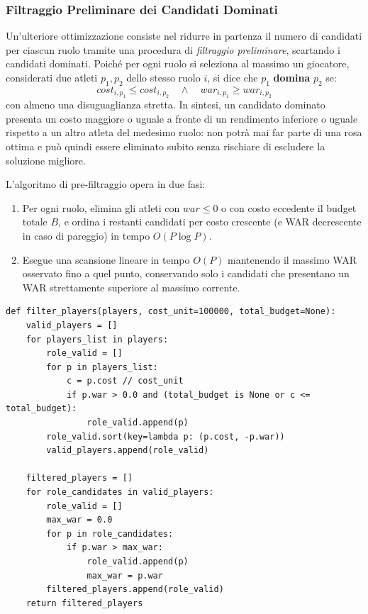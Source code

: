 \subsubsection{Filtraggio Preliminare dei Candidati Dominati}
Un'ulteriore ottimizzazione consiste nel ridurre in partenza il numero di candidati per ciascun ruolo tramite una procedura di \textit{filtraggio preliminare}, scartando i candidati dominati.
Poiché per ogni ruolo si seleziona al massimo un giocatore, considerati due atleti $p_1, p_2$ dello stesso ruolo $i$, si dice che $p_1$ \textbf{domina} $p_2$ se:
\begin{equation}
	\mathit{cost}_{i, p_1} \le \mathit{cost}_{i, p_2} \quad \wedge \quad \mathit{war}_{i, p_1} \ge \mathit{war}_{i, p_2}
\end{equation}
con almeno una disuguaglianza stretta. In sintesi, un candidato dominato presenta un costo maggiore o uguale a fronte di un rendimento inferiore o uguale rispetto a un altro atleta del medesimo ruolo: non potrà mai far parte di una rosa ottima e può quindi essere eliminato subito senza rischiare di escludere la soluzione migliore.

L'algoritmo di pre-filtraggio opera in due fasi:
\begin{enumerate}
	\item Per ogni ruolo, elimina gli atleti con $\mathit{war} \le 0$ o con costo eccedente il budget totale $B$, e ordina i restanti candidati per costo crescente (e WAR decrescente in caso di pareggio) in tempo $O(P \log P)$.
	\item Esegue una scansione lineare in tempo $O(P)$ mantenendo il massimo WAR osservato fino a quel punto, conservando solo i candidati che presentano un WAR strettamente superiore al massimo corrente.
\end{enumerate}

\noindent\begin{minipage}{\linewidth}
\begin{lstlisting}
def filter_players(players, cost_unit=100000, total_budget=None):
    valid_players = []
    for players_list in players:
        role_valid = []
        for p in players_list:
            c = p.cost // cost_unit
            if p.war > 0.0 and (total_budget is None or c <= total_budget):
                role_valid.append(p)
        role_valid.sort(key=lambda p: (p.cost, -p.war))
        valid_players.append(role_valid)

    filtered_players = []
    for role_candidates in valid_players:
        role_valid = []
        max_war = 0.0
        for p in role_candidates:
            if p.war > max_war:
                role_valid.append(p)
                max_war = p.war
        filtered_players.append(role_valid)
    return filtered_players
\end{lstlisting}
\end{minipage}

